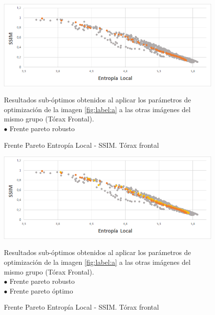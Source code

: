 \begin{figure}[H]
  \begin{center}
    \leavevmode
    \includegraphics[width=14cm]{Chapter6/Chapter6Figs/FP-torax_frontal/img1-FP-variado-Frontal-robusto.png}
    \caption {Frente Pareto Entropía Local - SSIM. Tórax frontal\\}{
    Resultados sub-óptimos obtenidos al aplicar los parámetros de optimización de la imagen \ref{fig:label:a} a las otras imágenes del mismo grupo (Tórax Frontal).\\
    {{\color{myorange} {$\bullet$}} Frente pareto robusto}}
    \label{fig:FP-robusto-sub-optimos}
  \end{center}
\end{figure}

\begin{figure}[H]
  \begin{center}
    \leavevmode
    \includegraphics[width=14cm]{Chapter6/Chapter6Figs/FP-torax_frontal/img1-FP-variado-optimo-robusto.png}
    \caption {Frente Pareto Entropía Local - SSIM. Tórax frontal\\}{
    Resultados sub-óptimos obtenidos al aplicar los parámetros de optimización de la imagen \ref{fig:label:a} a las otras imágenes del mismo grupo (Tórax Frontal).\\
    {{\color{myorange} {$\bullet$}} Frente pareto robusto} \\
    {{\color{yellow} {$\bullet$}} Frente pareto óptimo}}
    \label{fig:FP-robusto-sub-optimos-optimo}
  \end{center}
\end{figure}


